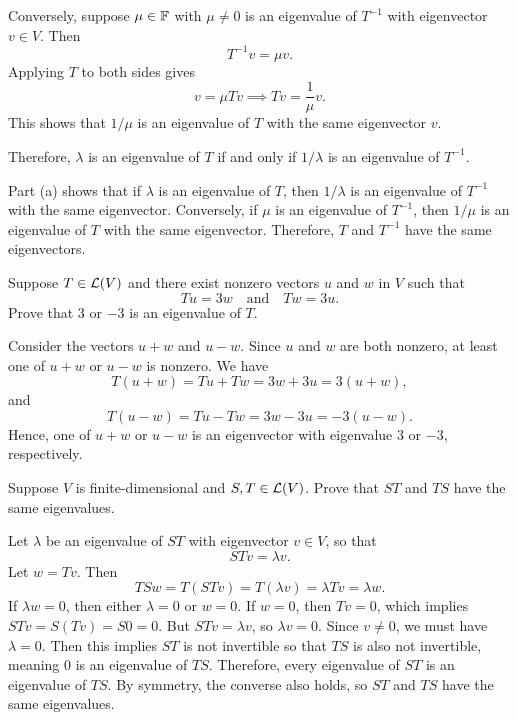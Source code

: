 \begin{exc}
\begin{solution}
\begin{parts}
  Conversely, suppose $\mu\in\mathbb{F}$ with $\mu\ne0$ is an eigenvalue of $T^{-1}$
  with eigenvector $v\in V$. Then
  \[ T^{-1}v = \mu v. \]
  Applying $T$ to both sides gives
  \[ v = \mu Tv \implies Tv = \frac{1}{\mu}v. \]
  This shows that $1/\mu$ is an eigenvalue of $T$ with the same
  eigenvector $v$.

  Therefore, $\lambda$ is an eigenvalue of $T$ if and only if
  $1/\lambda$ is an eigenvalue of $T^{-1}$.
\item Part (a) shows that if $\lambda$ is an eigenvalue of $T$, then
  $1/\lambda$ is an eigenvalue of $T^{-1}$ with the same eigenvector.
  Conversely, if $\mu$ is an eigenvalue of $T^{-1}$, then $1/\mu$ is an
  eigenvalue of $T$ with the same eigenvector. Therefore, $T$ and $T^{-1}$ have
  the same eigenvectors. \qedhere
\end{parts}
\end{solution}

\begin{exercise}
Suppose $T\in\mathcal{L}(V)$ and there exist nonzero vectors $u$ and $w$ in $V$ such
that
\[ Tu=3w \quad\text{and}\quad Tw=3u. \]
Prove that $3$ or $-3$ is an eigenvalue of $T$.
\end{exercise}
\begin{solution}
Consider the vectors $u+w$ and $u-w$. Since $u$ and $w$ are both nonzero, at
least one of $u+w$ or $u-w$ is nonzero. We have
\[ T(u+w) = Tu+Tw = 3w+3u = 3(u+w), \]
and
\[ T(u-w) = Tu-Tw = 3w-3u = -3(u-w). \]
Hence, one of $u+w$ or $u-w$ is an eigenvector with eigenvalue $3$ or $-3$,
respectively.
\end{solution}

\begin{exercise}
Suppose $V$ is finite-dimensional and $S,T\in\mathcal{L}(V)$. Prove that $ST$ and
$TS$ have the same eigenvalues.
\end{exercise}
\begin{solution}
Let $\lambda$ be an eigenvalue of $ST$ with eigenvector $v\in V$, so that
\[ STv = \lambda v. \]
Let $w=Tv$. Then
\[ TSw = T(STv) = T(\lambda v) = \lambda Tv = \lambda w. \]
If $\lambda w=0$, then either $\lambda=0$ or $w=0$. If $w=0$, then $Tv=0$,
which implies $STv=S(Tv)=S0=0$. But $STv=\lambda v$, so $\lambda v=0$. Since
$v\ne0$, we must have $\lambda=0$. Then this implies $ST$ is not invertible so
that $TS$ is also not invertible, meaning $0$ is an eigenvalue of $TS$.
Therefore, every eigenvalue of $ST$ is an eigenvalue of $TS$. By symmetry, the
converse also holds, so $ST$ and $TS$ have the same eigenvalues.
\end{solution}


\end{exc}
